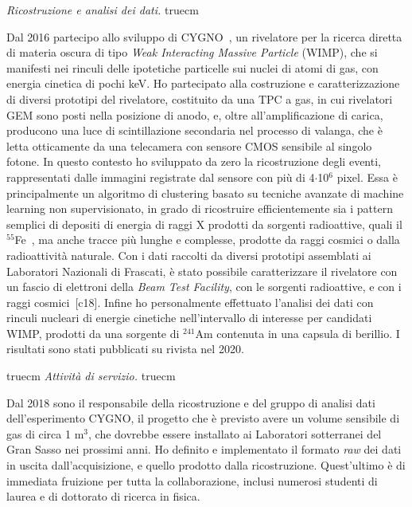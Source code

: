 \documentclass[11pt,twoside,a4paper]{article}
\begin{document}
\textit{Ricostruzione e analisi dei dati.}
 truecm

Dal 2016 partecipo allo sviluppo di CYGNO~\cite{Pinci:2019ztr}, un
rivelatore per la ricerca diretta di materia oscura di tipo
\textit{Weak Interacting Massive Particle} (WIMP), che si manifesti
nei rinculi delle ipotetiche particelle sui nuclei di atomi di gas,
con energia cinetica di pochi keV. Ho partecipato alla costruzione e
caratterizzazione di diversi prototipi del rivelatore, costituito da
una TPC a gas, in cui rivelatori GEM sono posti nella posizione di
anodo, e, oltre all'amplificazione di carica, producono una luce di
scintillazione secondaria nel processo di valanga, che \`e letta
otticamente da una telecamera con sensore CMOS sensibile al singolo
fotone.  In questo contesto ho sviluppato da zero la ricostruzione
degli eventi, rappresentati dalle immagini registrate dal sensore con
pi\`u di 4$\cdot$10$^6$ pixel.  Essa \`e principalmente un algoritmo
di clustering basato su tecniche avanzate di machine learning non
supervisionato, in grado di ricostruire efficientemente sia i pattern
semplici di depositi di energia di raggi X prodotti da sorgenti
radioattive, quali il $^{55}$Fe~\cite{Costa_2019}, ma anche tracce
pi\`u lunghe e complesse, prodotte da raggi cosmici o dalla
radioattivit\`a naturale.  Con i dati raccolti da diversi prototipi
assemblati ai Laboratori Nazionali di Frascati, \`e stato possibile
caratterizzare il rivelatore con un fascio di elettroni della
\textit{Beam Test Facility}, con le sorgenti radioattive, e con i
raggi cosmici~[c18]. Infine ho personalmente effettuato l'analisi dei
dati con rinculi nucleari di energie cinetiche nell'intervallo di
interesse per candidati WIMP, prodotti da una sorgente di $^{241}$Am
contenuta in una capsula di berillio. I risultati sono stati
pubblicati su rivista nel 2020.

 truecm
\textit{Attivit\`a di servizio.}
 truecm

Dal 2018 sono il responsabile della ricostruzione e del gruppo di
analisi dati dell'esperimento CYGNO, il progetto che \`e previsto
avere un volume sensibile di gas di circa 1 m$^3$, che dovrebbe essere
installato ai Laboratori sotterranei del Gran Sasso nei prossimi anni.
Ho definito e implementato il formato \textit{raw} dei dati in uscita
dall'acquisizione, e quello prodotto dalla ricostruzione. Quest'ultimo
\`e di immediata fruizione per tutta la collaborazione, inclusi
numerosi studenti di laurea e di dottorato di ricerca in fisica.

\clearpage

\nocite{*}


\end{document}
